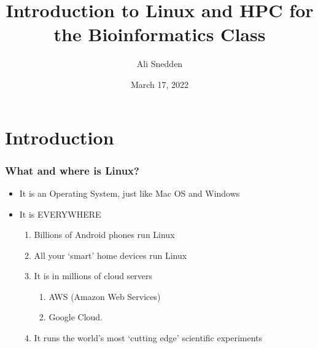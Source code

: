\documentclass{beamer}
\title{Introduction to Linux and HPC for the Bioinformatics Class}
\author{Ali Snedden}
\institute{Nationwide Children's Hospital}
\date{March 17, 2022}
\begin{document}
 
\frame{\titlepage}

\section{Introduction}

\begin{frame}
\frametitle{What and where is Linux?}
\begin{itemize}
    \item It is an Operating System, just like Mac OS and Windows  
    \pause 
    \item It is EVERYWHERE
    \begin{enumerate}
        \item Billions of Android phones run Linux
        \pause 
        \item All your `smart' home devices run Linux
        \pause 
        \item It is in millions of cloud servers
        \begin{enumerate}
            \item AWS (Amazon Web Services)
            \item Google Cloud.
        \end{enumerate}
        \pause 
        \item It runs the world's most `cutting edge' scientific experiments
    \end{enumerate}
\end{itemize}
\end{frame}
\end{document}
